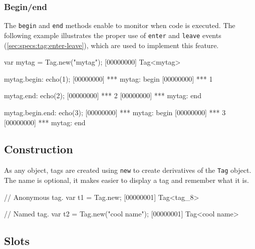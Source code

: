\subsubsection{Begin/end}
\label{sec:specs:tag:begin-end}

The \lstinline|begin| and \lstinline|end| methods enable to monitor
when code is executed.  The following example illustrates the proper
use of \lstinline|enter| and \lstinline|leave| events
(\autoref{sec:specs:tag:enter-leave}), which are used to implement
this feature.

\begin{urbiscript}
var mytag = Tag.new("mytag");
[00000000] Tag<mytag>

mytag.begin: echo(1);
[00000000] *** mytag: begin
[00000000] *** 1

mytag.end: echo(2);
[00000000] *** 2
[00000000] *** mytag: end

mytag.begin.end: echo(3);
[00000000] *** mytag: begin
[00000000] *** 3
[00000000] *** mytag: end
\end{urbiscript}

\subsection{Construction}
\label{stdlib:tag:ctor}

As any object, tags are created using \lstinline{new} to create
derivatives of the \lstinline{Tag} object.  The name is optional, it
makes easier to display a tag and remember what it is.

\begin{urbiscript}[firstnumber=1]
// Anonymous tag.
var t1 = Tag.new;
[00000001] Tag<tag_8>

// Named tag.
var t2 = Tag.new("cool name");
[00000001] Tag<cool name>
\end{urbiscript}

\subsection{Slots}

